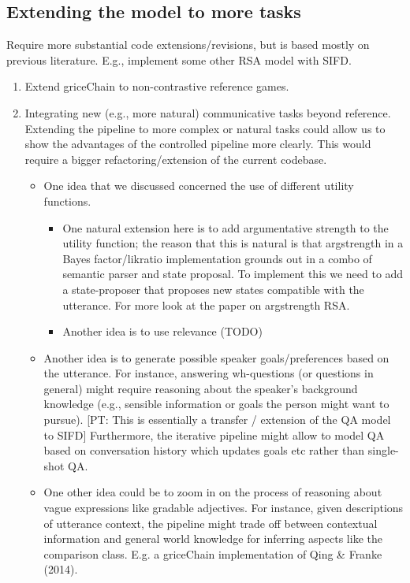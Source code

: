 \documentclass[fleqn,reqno,10pt]{article}
\newcommand{\pt}[1]{\textcolor{CSP-accent-1}{[PT: #1]}}
\begin{document}
\subsection{Extending the model to more tasks}

Require more substantial code extensions/revisions, but is based mostly on previous literature. E.g., implement some other RSA model with SIFD.

\begin{enumerate}
		\item Extend griceChain to non-contrastive reference games.
    \item Integrating new (e.g., more natural) communicative tasks beyond reference. Extending the pipeline to more complex or natural tasks could allow us to show the advantages of the controlled pipeline more clearly. This would require a bigger refactoring/extension of the current codebase.
        \begin{itemize}
            \item One idea that we discussed concerned the use of different utility functions. 
            \begin{itemize}
						    \item One natural extension here is to add argumentative strength to the utility function; the reason that this is natural is that argstrength in a Bayes factor/likratio implementation grounds out in a combo of semantic parser and state proposal. To implement this we need to add a state-proposer that proposes new states compatible with the utterance. For more look at the paper on argstrength RSA.
						    \item Another idea is to use relevance (TODO)
						\end{itemize}
            \item Another idea is to generate possible speaker goals/preferences based on the utterance. For instance, answering wh-questions (or questions in general) might require reasoning about the speaker's background knowledge (e.g., sensible information or goals the person might want to pursue). \pt{This is essentially a transfer / extension of the QA model to SIFD} Furthermore, the iterative pipeline might allow to model QA based on conversation history which updates goals etc rather than single-shot QA.
            \item One other idea could be to zoom in on the process of reasoning about vague expressions like gradable adjectives. For instance, given descriptions of utterance context, the pipeline might trade off between contextual information and general world knowledge for inferring aspects like the comparison class. E.g. a griceChain implementation of Qing \& Franke (2014).
        \end{itemize}
\end{enumerate}
\end{document}

